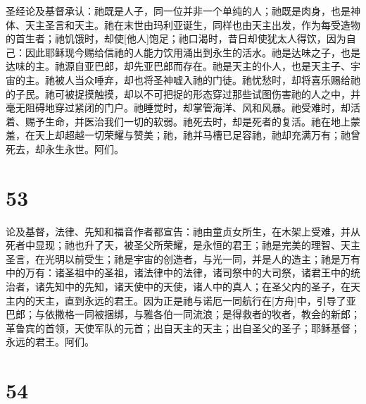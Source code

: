 圣经论及基督承认：祂既是人子，同一位并非一个单纯的人；祂既是肉身，也是神体、天主圣言和天主。祂在末世由玛利亚诞生，同样也由天主出发，作为每受造物的首生者；祂饥饿时，却使[他人]饱足；祂口渴时，昔日却使犹太人得饮，因为自己：因此耶稣现今赐给信祂的人能力饮用涌出到永生的活水。祂是达味之子，也是达味的主。祂源自亚巴郎，却先亚巴郎而存在。祂是天主的仆人，也是天主子、宇宙的主。祂被人当众唾弃，却也将圣神嘘入祂的门徒。祂忧愁时，却将喜乐赐给祂的子民。祂可被捉摸触摸，却以不可把捉的形态穿过那些试图伤害祂的人之中，并毫无阻碍地穿过紧闭的门户。祂睡觉时，却掌管海洋、风和风暴。祂受难时，却活着、赐予生命，并医治我们一切的软弱。祂死去时，却是死者的复活。祂在地上蒙羞，在天上却超越一切荣耀与赞美；祂，祂并马槽已足容祂，祂却充满万有；祂曾死去，却永生永世。阿们。\par


\section{53}

论及基督，法律、先知和福音作者都宣告：祂由童贞女所生，在木架上受难，并从死者中显现；祂也升了天，被圣父所荣耀，是永恒的君王；祂是完美的理智、天主圣言，在光明以前受生；祂是宇宙的创造者，与光一同，并是人的造主；祂是万有中的万有：诸圣祖中的圣祖，诸法律中的法律，诸司祭中的大司祭，诸君王中的统治者，诸先知中的先知，诸天使中的天使，诸人中的真人；在圣父内的圣子，在天主内的天主，直到永远的君王。因为正是祂与诺厄一同航行在[方舟]中，引导了亚巴郎；与依撒格一同被捆绑，与雅各伯一同流浪；是得救者的牧者，教会的新郎；革鲁宾的首领，天使军队的元首；出自天主的天主；出自圣父的圣子；耶稣基督；永远的君王。阿们。\par


\section{54}

